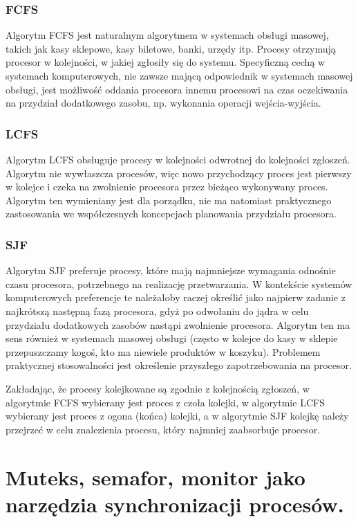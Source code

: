 \documentclass[12pt]{article}
\begin{document}
    \subsubsection{FCFS}
    Algorytm FCFS jest naturalnym algorytmem w systemach obsługi masowej, takich jak kasy sklepowe, kasy biletowe, banki, urzędy itp. Procesy otrzymują procesor w kolejności, w jakiej zgłosiły się do systemu. Specyficzną cechą w systemach komputerowych, nie zawsze mającą odpowiednik w systemach masowej obsługi, jest możliwość oddania procesora innemu procesowi na czas oczekiwania na przydział dodatkowego zasobu, np. wykonania operacji wejścia-wyjścia.
    
    \subsubsection{LCFS}
    Algorytm LCFS obsługuje procesy w kolejności odwrotnej do kolejności zgłoszeń. Algorytm nie wywłaszcza procesów, więc nowo przychodzący proces jest pierwszy w kolejce i czeka na zwolnienie procesora przez bieżąco wykonywany proces. Algorytm ten wymieniany jest dla porządku, nie ma natomiast praktycznego zastosowania we współczesnych koncepcjach planowania przydziału procesora.
    
    \subsubsection{SJF}
    Algorytm SJF preferuje procesy, które mają najmniejsze wymagania odnośnie czasu procesora, potrzebnego na realizację przetwarzania. W kontekście systemów komputerowych preferencje te należałoby raczej określić jako najpierw zadanie z najkrótszą następną fazą procesora, gdyż po odwołaniu do jądra w celu przydziału dodatkowych zasobów nastąpi zwolnienie procesora. Algorytm ten ma sens również w systemach masowej obsługi (często w kolejce do kasy w sklepie przepuszczamy kogoś, kto ma niewiele produktów w koszyku). Problemem praktycznej stosowalności jest określenie przyszłego zapotrzebowania na procesor.
    
    Zakładając, że procesy kolejkowane są zgodnie z kolejnością zgłoszeń, w algorytmie FCFS wybierany jest proces z czoła kolejki, w algorytmie LCFS wybierany jest proces z ogona (końca) kolejki, a w algorytmie SJF kolejkę należy przejrzeć w celu znalezienia procesu, który najmniej zaabsorbuje procesor.

\newpage
    \section{Muteks, semafor, monitor jako narzędzia synchronizacji procesów.}
\end{document}
